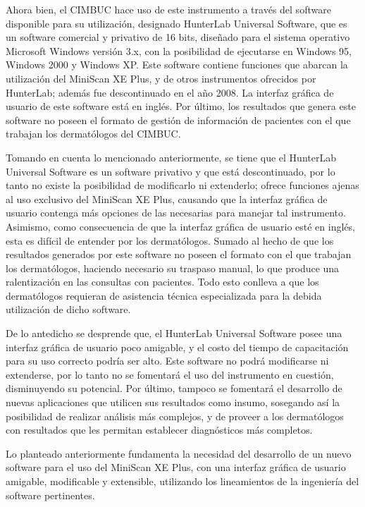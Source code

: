 Ahora bien, el CIMBUC hace uso de este instrumento a trav\'{e}s del software disponible para su utilizaci\'{o}n, designado HunterLab Universal Software, que es un software comercial y privativo de 16 bits, dise\~{n}ado para el sistema operativo Microsoft Windows versi\'{o}n 3.x, con la posibilidad de ejecutarse en Windows 95, Windows 2000 y Windows XP. Este software contiene funciones que abarcan la utilizaci\'{o}n del MiniScan XE Plus, y de otros instrumentos ofrecidos por HunterLab; adem\'{a}s fue descontinuado en el a\~{n}o 2008. La interfaz gr\'{a}fica de usuario de este software est\'{a} en ingl\'{e}s. Por \'{u}ltimo, los resultados que genera este software no poseen el formato de gesti\'{o}n de informaci\'{o}n de pacientes con el que trabajan los dermat\'{o}logos del CIMBUC.

Tomando en cuenta lo mencionado anteriormente, se tiene que el HunterLab Universal Software es un software privativo y que est\'{a} descontinuado, por lo tanto no existe la posibilidad de modificarlo ni extenderlo; ofrece funciones ajenas al uso exclusivo del MiniScan XE Plus, causando que la interfaz gr\'{a}fica de usuario contenga m\'{a}s opciones de las necesarias para manejar tal instrumento. Asimismo, como consecuencia de que la interfaz gr\'{a}fica de usuario est\'{e} en ingl\'{e}s, esta es dif\'{i}cil de entender por los dermat\'{o}logos. Sumado al hecho de que los resultados generados por este software no poseen el formato con el que trabajan los dermat\'{o}logos, haciendo necesario su traspaso manual, lo que produce una ralentizaci\'{o}n en las consultas con pacientes. Todo esto conlleva a que los dermat\'{o}logos requieran de asistencia t\'{e}cnica especializada para la debida utilizaci\'{o}n de dicho software.

De lo antedicho se desprende que, el HunterLab Universal Software posee una interfaz gr\'{a}fica de usuario poco amigable, y el costo del tiempo de capacitaci\'{o}n para su uso correcto podr\'{i}a ser alto. Este software no podr\'{a} modificarse ni extenderse, por lo tanto no se fomentar\'{a} el uso del instrumento en cuesti\'{o}n, disminuyendo su potencial. Por \'{u}ltimo, tampoco se fomentar\'{a} el desarrollo de nuevas aplicaciones que utilicen sus resultados como insumo, sosegando as\'{i} la posibilidad de realizar an\'{a}lisis m\'{a}s complejos, y de proveer a los dermat\'{o}logos con resultados que les permitan establecer diagn\'{o}sticos m\'{a}s completos.

Lo planteado anteriormente fundamenta la necesidad del desarrollo de un nuevo software para el uso del MiniScan XE Plus, con una interfaz gr\'{a}fica de usuario amigable, modificable y extensible, utilizando los lineamientos de la ingenier\'{i}a del software pertinentes.

